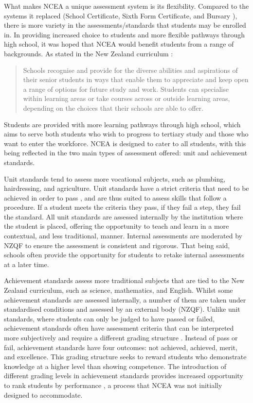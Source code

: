 \documentclass[a4paper]{article}
\begin{document}
What makes NCEA a unique assessment system is its flexibility. Compared to the systems it replaced (School Certificate, Sixth Form Certificate, and Bursary \cite{Mahoney2005}), there is more variety in the assessments/standards that students may be enrolled in. In providing increased choice to students and more flexible pathways through high school, it was hoped that NCEA would benefit students from a range of backgrounds. As stated in the New Zealand curriculum \cite[p.41]{NZCurriculum2007}: \begin{quote}
Schools recognise and provide for the
diverse abilities and aspirations of their senior students in ways that enable them to appreciate and keep open a range of options for future study and work. Students can specialise within learning areas or take courses across or outside learning areas, depending on the choices that their schools are able to offer.
\end{quote}
Students are provided with more learning pathways through high school, which aims to serve both students who wish to progress to tertiary study and those who want to enter the workforce. NCEA is designed to cater to all students, with this being reflected in the two main types of assessment offered: unit and achievement standards. 

Unit standards tend to assess more vocational subjects, such as plumbing, hairdressing, and agriculture. Unit standards have a strict criteria that need to be achieved in order to pass \cite{hipkins2016ncea}, and are thus suited to assess skills that follow a procedure. If a student meets the criteria they pass, if they fail a step, they fail the standard. All unit standards are assessed internally by the institution where the student is placed, offering the opportunity to teach and learn in a more contextual, and less traditional, manner. Internal assessments are moderated by NZQF to ensure the assessment is consistent and rigorous. That being said, schools often provide the opportunity for students to retake internal assessments at a later time.

Achievement standards assess more traditional subjects that are tied to the New Zealand curriculum, such as science, mathematics, and English. Whilst some achievement standards are assessed internally, a number of them are taken under standardised conditions and assessed by an external body (NZQF). Unlike unit standards, where students can only be judged to have passed or failed, achievement standards often have assessment criteria that can be interpreted more subjectively and require a different grading structure \cite{hipkins2016ncea}. Instead of pass or fail, achievement standards have four outcomes: not achieved, achieved, merit, and excellence. This grading structure seeks to reward students who demonstrate knowledge at a higher level than showing competence. The introduction of different grading levels in achievement standards provides increased opportunity to rank students by performance \cite{shulruf2010new}, a process that NCEA was not initially designed to accommodate.
\end{document}
